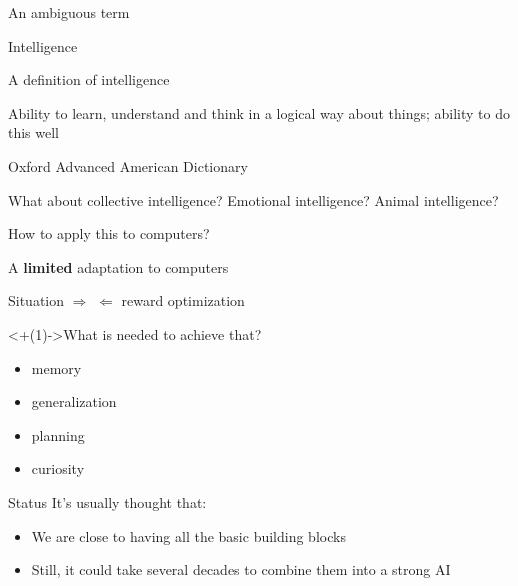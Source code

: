 \begin{frame}{An ambiguous term}
  \begin{center}
    \huge{Intelligence}
  \end{center}
\end{frame}

\begin{frame}{A definition of intelligence}
  \epigraph{Ability to learn, understand and think in a logical way about things; ability to do this well}{Oxford Advanced American Dictionary}

  \pause

  What about collective intelligence? Emotional intelligence? Animal intelligence?

  \pause

  How to apply this to computers?
\end{frame}

\begin{frame}{A \textbf{limited} adaptation to computers}
  \begin{center}
    Situation $\Rightarrow$  $\Leftarrow$ reward optimization
  \end{center}

  \onslide<+(1)->{What is needed to achieve that?}


  \begin{itemize}[<+(1)->]
  \item memory
  \item generalization
  \item planning
  \item curiosity
  \end{itemize}
\end{frame}

\begin{frame}{Status}
  It's usually thought that:

  \begin{itemize}[<+(1)->]
    \item We are close to having all the basic building blocks
    \item Still, it could take several decades to combine them into a strong AI
  \end{itemize}
\end{frame}
